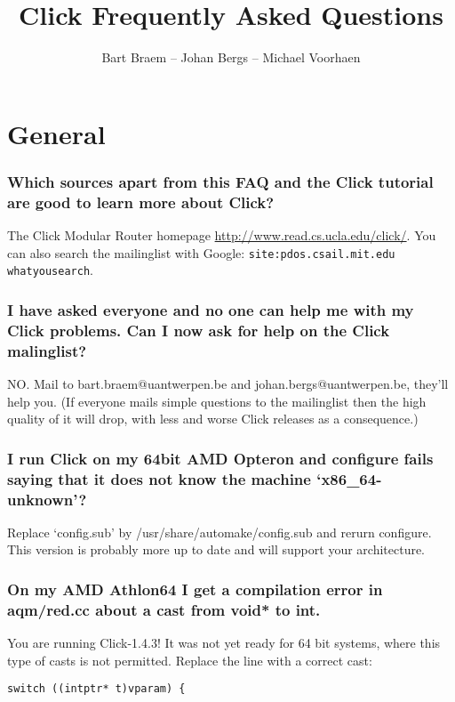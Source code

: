 \documentclass[a4paper]{article}
\author{Bart Braem -- Johan Bergs -- Michael Voorhaen}
\title{Click Frequently Asked Questions}
\date{}
\begin{document}
\maketitle
\tableofcontents

\section{General} %
\label{sec:general}

\subsubsection*{Which sources apart from this FAQ and the Click tutorial are good to learn more about Click?} %
The Click Modular Router homepage \url{http://www.read.cs.ucla.edu/click/}. You can  also search the mailinglist with Google: \texttt{site:pdos.csail.mit.edu whatyousearch}.


\subsubsection*{I have asked everyone and no one can help me with my Click problems. Can
I now ask for help on the Click malinglist?}

NO. Mail to bart.braem@uantwerpen.be and johan.bergs@uantwerpen.be, they'll
help you. (If everyone mails simple questions to the mailinglist then
the high quality of it will drop, with less and worse Click releases as
a consequence.)

\subsubsection*{I run Click on my 64bit AMD Opteron and configure fails saying that it
does not know the machine `x86\_64-unknown'?}

Replace `config.sub' by /usr/share/automake/config.sub and rerurn
configure. This version is probably more up to date and will support
your architecture.

\subsubsection*{On my AMD Athlon64 I get a compilation error in aqm/red.cc about a cast
from void* to int.}

You are running Click-1.4.3! It was not yet ready for 64 bit systems,
where this type of casts is not permitted. Replace the line with a
correct cast:
\begin{lstlisting}
switch ((intptr* t)vparam) {
\end{lstlisting}
\end{document}
